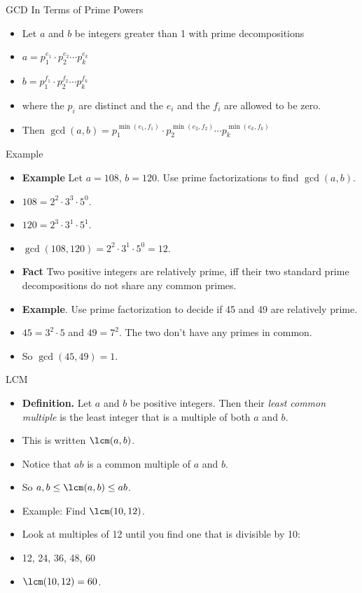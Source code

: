 \documentclass[handout]{beamer}
\begin{document}
\begin{frame}{GCD In Terms of Prime Powers}

\begin{itemize}
  \item Let $a$ and $b$ be integers greater than 1 with prime decompositions
  \item $a=p_1^{e_1} \cdot p_2^{e_2} \cdots p_k^{e_k}$
  \item $b=p_1^{f_1} \cdot p_2^{f_2} \cdots p_k^{f_k}$
  \item where the $p_i$ are distinct and the $e_i$ and the $f_i$ are allowed to be zero.
  \item Then $\gcd(a,b) = p_1^{\min(e_1,f_1)} \cdot p_2^{\min(e_2,f_2)} \cdots p_k^{\min(e_k,f_k)}$
\end{itemize}

\end{frame}

\begin{frame}{Example}

\begin{itemize}
  \item \textbf{Example} Let $a=108$, $b=120$. Use prime factorizations to find $\gcd(a,b)$.
  \item $108 =  2^2 \cdot 3^3 \cdot 5^0$.
  \item $120 =  2^3 \cdot 3^1 \cdot 5^1$.
  \item $\gcd(108,120) = 2^2\cdot 3^1 \cdot 5^0 = 12$.
  \item \textbf{Fact} Two positive integers are relatively prime, iff their two standard prime
  decompositions do not share any common primes.
  \item \textbf{Example}. Use prime factorization to decide if 45 and 49 are relatively prime.
  \item $45 = 3^2 \cdot 5$ and $49 = 7^2$. The two don't have any primes in common.
  \item So $\gcd(45,49) = 1$.
\end{itemize}

\end{frame}

\begin{frame}{LCM}

\begin{itemize}
  \item \textbf{Definition.} Let $a$ and $b$ be positive integers.
  Then their \emph{least common multiple} is the least integer that is
  a multiple of both $a$ and $b$.
  \item This is written $\lcm(a,b)$.
  \item Notice that $ab$ is a common multiple of $a$ and $b$.
  \item So $a,b\leq \lcm(a,b) \leq ab$.
  \item Example: Find $\lcm(10,12)$.
  \item Look at multiples of 12 until you find one that is divisible by 10:
  \item 12, 24, 36, 48, 60
  \item $\lcm(10,12) = 60$.
\end{itemize}

\end{frame}
\end{document}
